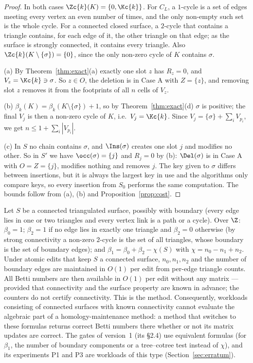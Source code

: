 \begin{proof}
In both cases $\Zc{k}(K)=\{0,\Kc{k}\}$. For $C_L$, a $1$-cycle is a set of edges
meeting every vertex an even number of times, and the only non-empty such set is
the whole cycle. For a connected closed surface, a $2$-cycle that contains a
triangle contains, for each edge of it, the other triangle on that edge; as the
surface is strongly connected, it contains every triangle. Also
$\Zc{k}(K\setminus\{\sigma\})=\{0\}$, since the only non-zero cycle of $K$
contains $\sigma$.

(a) By Theorem~\ref{thm:exact}(a) exactly one slot $z$ has $R_z=0$, and
$V_z=\Kc{k}\ni\sigma$. So $z\in O$, the deletion is in Case A with $Z=\{z\}$, and
removing slot $z$ removes it from the footprints of all $n$ cells of $V_z$.

(b) $\beta_k(K)=\beta_k(K\setminus\{\sigma\})+1$, so by
Theorem~\ref{thm:exact}(d) $\sigma$ is positive; the final $V_j$ is then a non-zero
cycle of $K$, i.e.\ $V_j=\Kc{k}$. Since $V_j=\{\sigma\}+\sum_iV_{p_i}$, we get
$n\le1+\sum_i|V_{p_i}|$.

(c) In $S$ no chain contains $\sigma$, and $\Ins(\sigma)$ creates one slot $j$
and modifies no other. So in $S'$ we have $\occ(\sigma)=\{j\}$ and $R_j=0$ by
(b): $\Del(\sigma)$ is in Case A with $O=Z=\{j\}$, modifies nothing and removes
$j$. The key given to $\sigma$ differs between insertions, but it is always the
largest key in use and the algorithms only compare keys, so every insertion from
$S_0$ performs the same computation. The bounds follow from (a), (b) and
Proposition~\ref{prop:cost}.
\end{proof}

\begin{remark}\label{rem:surfaces}
Let $S$ be a connected triangulated surface, possibly with boundary (every edge
lies in one or two triangles and every vertex link is a path or a cycle). Over
$\Z$: $\beta_0=1$; $\beta_2=1$ if no edge lies in exactly one triangle and
$\beta_2=0$ otherwise (by strong connectivity a non-zero $2$-cycle is the set of
all triangles, whose boundary is the set of boundary edges); and
$\beta_1=\beta_0+\beta_2-\chi(S)$ with $\chi=n_0-n_1+n_2$. Under atomic edits that
keep $S$ a connected surface, $n_0,n_1,n_2$ and the number of boundary edges are
maintained in $O(1)$ per edit from per-edge triangle counts. All Betti numbers
are then available in $O(1)$ per edit without any matrix --- provided that
connectivity and the surface property are known in advance; the counters do not
certify connectivity. This is the  method. Consequently, workloads
consisting of connected surfaces with known connectivity cannot evaluate the
algebraic part of a homology-maintenance method: a method that switches to these
formulas returns correct Betti numbers there whether or not its matrix updates
are correct. The gates of version~1 (its \S2.4) use equivalent formulas (for
$\beta_1$, the number of boundary components or a tree--cotree test instead of
$\chi$), and its experiments P1 and P3 are workloads of this type
(Section~\ref{sec:erratum}).
\end{remark}
